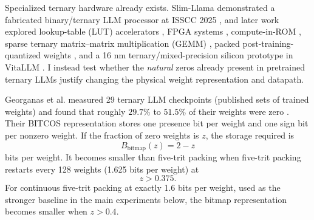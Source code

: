 \documentclass[11pt]{article}
\begin{document}
Specialized ternary hardware already exists. Slim-Llama demonstrated a fabricated binary/ternary LLM processor at ISSCC 2025 \cite{kim2025slimllama}, and later work explored lookup-table (LUT) accelerators \cite{huang2025tenet,geens2026lut}, FPGA systems \cite{qiao2025tellme}, compute-in-ROM \cite{zhang2026bitrom}, sparse ternary matrix--matrix multiplication (GEMM) \cite{pittet2026ssr,zhu2026sparsegemm}, packed post-training-quantized weights \cite{jung2026tace}, and a 16 nm ternary/mixed-precision silicon prototype in VitaLLM \cite{lin2026vitallm}. I instead test whether the \emph{natural} zeros already present in pretrained ternary LLMs justify changing the physical weight representation and datapath.

Georganas et al. measured 29 ternary LLM checkpoints (published sets of trained weights) and found that roughly $29.7\%$ to $51.5\%$ of their weights were zero \cite{georganas2026bitcos}. Their BITCOS representation stores one presence bit per weight and one sign bit per nonzero weight. If the fraction of zero weights is $z$, the storage required is
\begin{equation}
B_{\mathrm{bitmap}}(z)=2-z
\end{equation}
bits per weight. It becomes smaller than five-trit packing when five-trit packing restarts every 128 weights (1.625 bits per weight) at
\begin{equation}
z>0.375.
\end{equation}
For continuous five-trit packing at exactly 1.6 bits per weight, used as the stronger baseline in the main experiments below, the bitmap representation becomes smaller when $z>0.4$.
\end{document}
